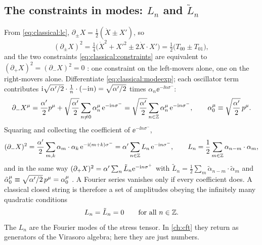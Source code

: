 \subsection{The constraints in modes: \texorpdfstring{$L_n$}{Ln} and \texorpdfstring{$\tilde L_n$}{Ln-tilde}}

From \eqref{eq:classical:lc}, $\partial_\pm X=\tfrac12(\dot X\pm X')$, so
\begin{equation}\label{eq:classical:lcconstraints}
  (\partial_\pm X)^2=\tfrac14\big(\dot X^2+X'^2\pm2\dot X\cdot X'\big)=\tfrac12\big(T_{00}\pm T_{01}\big),
\end{equation}
and the two constraints \eqref{eq:classical:constraints} are equivalent to
$(\partial_+X)^2=(\partial_-X)^2=0$ : one constraint on
the left-movers alone, one on the right-movers alone. Differentiate
\eqref{eq:classical:modeexp}; each oscillator term contributes
$\mathrm{i}\sqrt{\alpha'/2}\cdot\frac1n\cdot(-\mathrm{i} n)=\sqrt{\alpha'/2}$ times $\alpha_n\ee^{-\ii n\sigma^-}$:
\begin{equation}\label{eq:classical:dminusX}
  \partial_-X^\mu=\frac{\alpha'}{2}p^\mu+\sqrt{\frac{\alpha'}{2}}\sum_{n\neq0}\alpha_n^\mu\,\mathrm{e}^{-\mathrm{i} n\sigma^-}
   =\sqrt{\frac{\alpha'}{2}}\sum_{n\in\mathbb{Z}}\alpha_n^\mu\,\mathrm{e}^{-\mathrm{i} n\sigma^-},
  \qquad \alpha_0^\mu\equiv\sqrt{\frac{\alpha'}{2}}\,p^\mu .
\end{equation}
Squaring and collecting the coefficient of $\ee^{-\ii n\sigma^-}$,
\begin{equation}\label{eq:classical:Ln}
  (\partial_-X)^2=\frac{\alpha'}{2}\sum_{m,k}\alpha_m\cdot\alpha_k\,\mathrm{e}^{-\mathrm{i}(m+k)\sigma^-}
  =\alpha'\sum_{n\in\mathbb{Z}}L_n\,\mathrm{e}^{-\mathrm{i} n\sigma^-},\qquad
  L_n=\frac12\sum_{m\in\mathbb{Z}}\alpha_{n-m}\cdot\alpha_m ,
\end{equation}
and in the same way $(\partial_+X)^2=\alpha'\sum_n\tilde L_n\mathrm{e}^{-\mathrm{i} n\sigma^+}$ with
$\tilde L_n=\frac12\sum_m\tilde\alpha_{n-m}\cdot\tilde\alpha_m$ and
$\tilde\alpha_0^\mu\equiv\sqrt{\alpha'/2}\,p^\mu=\alpha_0^\mu$
. A Fourier series vanishes only if every coefficient
does. A classical closed string is therefore a set of amplitudes obeying the infinitely many
quadratic conditions
\begin{equation}\label{eq:classical:virasoro}
  L_n=\tilde L_n=0\qquad\text{for all }n\in\mathbb{Z} .
\end{equation}
The $L_n$ are the Fourier modes of the stress tensor. In \cref{ch:cft} they return as
generators of the Virasoro algebra; here they are just numbers.

